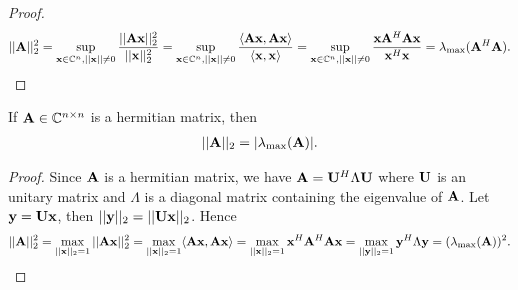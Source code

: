 \begin{proof}
    \begin{align*}
        ||\bold{A}||_2^2=\sup_{\bold{x}\in\mathbb{C}^n,||\bold{x}||\neq 0} \frac{||\bold{Ax}||_2^2}{||\bold{x}||_2^2}
        =\sup_{\bold{x}\in\mathbb{C}^n,||\bold{x}||\neq 0}\frac{\langle\bold{Ax},\bold{Ax}\rangle}{\langle\bold{x},\bold{x}\rangle}
        =\sup_{\bold{x}\in\mathbb{C}^n,||\bold{x}||\neq 0}\frac{\bold{x}\bold{A}^H\bold{A}\bold{x}}{\bold{x}^H\bold{x}}
        =\lambda_{\text{max}}(\bold{A}^H\bold{A}).
    \end{align*}
\end{proof}

\begin{proposition}{}{}
    If $\bold{A}\in \mathbb{C}^{n\times n}$ is a hermitian matrix, then 
    \begin{align*}
        ||\bold{A}||_2= |\lambda_{\max}(\bold{A})|.
    \end{align*}
\end{proposition}

\begin{proof}
    Since $\bold{A}$ is a hermitian matrix, we have $\bold{A}=\bold{U}^H\Lambda \bold{U}$ where $\bold{U}$ is an unitary matrix and $\Lambda$ is a diagonal matrix containing the eigenvalue of $\bold{A}$.
    Let $\bold{y}=\bold{Ux}$, then $||\bold{y}||_2=||\bold{Ux}||_2$. Hence 
    \begin{align*}
        ||\bold{A}||_2^2=\max_{||\bold{x}||_2=1} ||\bold{Ax}||_2^2 = \max_{||\bold{x}||_2=1} \langle\bold{Ax},\bold{Ax}\rangle
        = \max_{||\bold{x}||_2=1} \bold{x}^H\bold{A}^H\bold{A}\bold{x} =\max_{||\bold{y}||_2=1} \bold{y}^H\Lambda\bold{y}=(\lambda_{\max}(\bold{A}))^2.
    \end{align*}
\end{proof}


